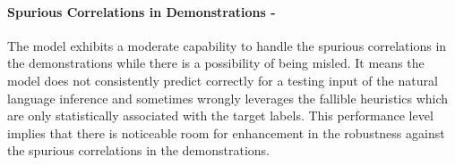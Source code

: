 \paragraph{Spurious Correlations in Demonstrations - \moderate}
The model exhibits a moderate capability to handle the spurious correlations in the demonstrations while there is a possibility of being misled. It means the model does not consistently predict correctly for a testing input of the natural language inference and sometimes wrongly leverages the fallible heuristics which are only statistically associated with the target labels. This performance level implies that there is noticeable room for enhancement in the robustness against the spurious correlations in the demonstrations.